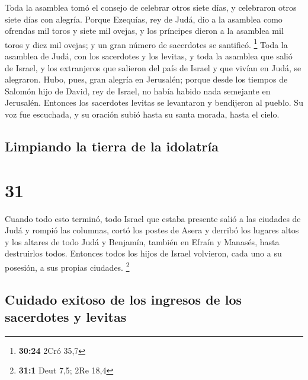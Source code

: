  Toda la asamblea tomó el consejo de celebrar otros siete
días, y celebraron otros siete días con alegría.  Porque
Ezequías, rey de Judá, dio a la asamblea como ofrendas mil toros y siete
mil ovejas, y los príncipes dieron a la asamblea mil toros y diez mil
ovejas; y un gran número de sacerdotes se santificó. \footnote{\textbf{30:24}
  2Cró 35,7}  Toda la asamblea de Judá, con los
sacerdotes y los levitas, y toda la asamblea que salió de Israel, y los
extranjeros que salieron del país de Israel y que vivían en Judá, se
alegraron.  Hubo, pues, gran alegría en Jerusalén; porque
desde los tiempos de Salomón hijo de David, rey de Israel, no había
habido nada semejante en Jerusalén.  Entonces los
sacerdotes levitas se levantaron y bendijeron al pueblo. Su voz fue
escuchada, y su oración subió hasta su santa morada, hasta el cielo.

\hypertarget{limpiando-la-tierra-de-la-idolatruxeda}{%
\subsection{Limpiando la tierra de la
idolatría}\label{limpiando-la-tierra-de-la-idolatruxeda}}

\hypertarget{section-30}{%
\section{31}\label{section-30}}

 Cuando todo esto terminó, todo Israel que estaba presente
salió a las ciudades de Judá y rompió las columnas, cortó los postes de
Asera y derribó los lugares altos y los altares de todo Judá y Benjamín,
también en Efraín y Manasés, hasta destruirlos todos. Entonces todos los
hijos de Israel volvieron, cada uno a su posesión, a sus propias
ciudades. \footnote{\textbf{31:1} Deut 7,5; 2Re 18,4}

\hypertarget{cuidado-exitoso-de-los-ingresos-de-los-sacerdotes-y-levitas}{%
\subsection{Cuidado exitoso de los ingresos de los sacerdotes y
levitas}\label{cuidado-exitoso-de-los-ingresos-de-los-sacerdotes-y-levitas}}

